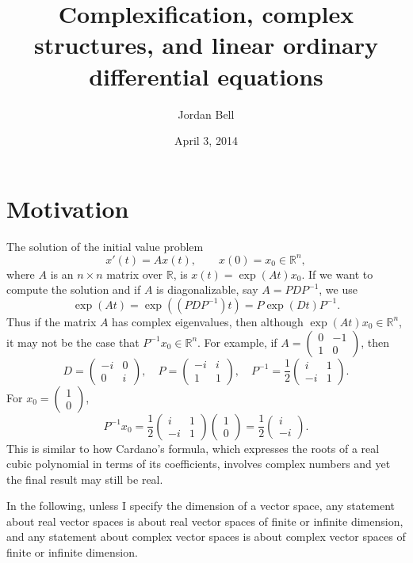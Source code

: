 \documentclass{article}
\begin{document}
\title{Complexification, complex structures, and linear ordinary differential equations}
\author{Jordan Bell}
\date{April 3, 2014}
\maketitle

\section{Motivation}
The solution of the initial value problem 
\[
x'(t)=Ax(t), \qquad x(0)=x_0 \in \mathbb{R}^n,
\]
where $A$ is an $n \times n$ matrix over $\mathbb{R}$,
is $x(t)=\exp(At)x_0$. If we want to compute the solution and if $A$ is diagonalizable, say $A=PDP^{-1}$, we use
\[
\exp(At)=\exp((PDP^{-1})t)=P\exp(Dt)P^{-1}.
\]
Thus if the matrix $A$ has complex eigenvalues, then although $\exp(At)x_0 \in \mathbb{R}^n$, it may not be the case that $P^{-1}x_0 \in \mathbb{R}^n$. 
For example, if $A=\begin{pmatrix}0&-1\\1&0\end{pmatrix}$, then
\[
D=\begin{pmatrix}-i&0\\0&i\end{pmatrix}, \quad
P=\begin{pmatrix}-i&i\\1&1\end{pmatrix}, \quad
P^{-1}=\frac{1}{2}\begin{pmatrix}i&1\\-i&1\end{pmatrix}.
\]
For $x_0=\begin{pmatrix}1\\0\end{pmatrix}$, 
\[
P^{-1}x_0=\frac{1}{2}\begin{pmatrix}i&1\\-i&1\end{pmatrix} \begin{pmatrix}1\\0\end{pmatrix}
=\frac{1}{2} \begin{pmatrix}i\\-i\end{pmatrix}.
\]
This is similar to how Cardano's formula, which expresses the roots of a real cubic polynomial in terms of its coefficients,
involves complex numbers and yet the final result may still be real.

In the following, unless I specify the dimension of a vector space, any statement about real vector spaces is about real vector spaces of finite or infinite dimension, and any
statement about complex vector spaces is about complex vector spaces of finite or infinite dimension. 
\end{document}

